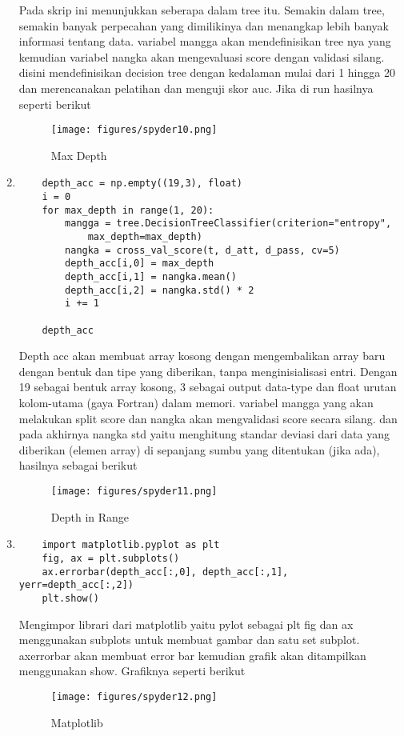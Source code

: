\begin{enumerate}
\par
Pada skrip ini menunjukkan seberapa dalam tree itu. Semakin dalam tree, semakin banyak perpecahan yang dimilikinya dan menangkap lebih banyak informasi tentang data. variabel mangga akan mendefinisikan tree nya yang kemudian variabel nangka akan mengevaluasi score dengan validasi silang. disini mendefinisikan decision tree dengan kedalaman mulai dari 1 hingga 20 dan merencanakan pelatihan dan menguji skor auc. Jika di run hasilnya seperti berikut
\begin{figure}[ht]
\centering
\texttt{[image: figures/spyder10.png]}
\caption{Max Depth}
\label{Spyder}
\end{figure}
\item
\begin{verbatim}
	depth_acc = np.empty((19,3), float)
	i = 0
	for max_depth in range(1, 20):
	    mangga = tree.DecisionTreeClassifier(criterion="entropy", 
			max_depth=max_depth)
	    nangka = cross_val_score(t, d_att, d_pass, cv=5)
	    depth_acc[i,0] = max_depth
	    depth_acc[i,1] = nangka.mean()
	    depth_acc[i,2] = nangka.std() * 2
	    i += 1

	depth_acc
\end{verbatim}

\par
Depth acc akan membuat array kosong dengan mengembalikan array baru dengan bentuk dan tipe yang diberikan, tanpa menginisialisasi entri. Dengan 19 sebagai bentuk array kosong, 3 sebagai output data-type dan float urutan kolom-utama (gaya Fortran) dalam memori. variabel mangga yang akan melakukan split score dan nangka akan mengvalidasi score secara silang. dan pada akhirnya nangka std yaitu menghitung standar deviasi dari data yang diberikan (elemen array) di sepanjang sumbu yang ditentukan (jika ada), hasilnya sebagai berikut
\begin{figure}[ht]
\centering
\texttt{[image: figures/spyder11.png]}
\caption{Depth in Range}
\label{Spyder}
\end{figure}
\item 
\begin{verbatim}
	import matplotlib.pyplot as plt
	fig, ax = plt.subplots()
	ax.errorbar(depth_acc[:,0], depth_acc[:,1], yerr=depth_acc[:,2])
	plt.show()
\end{verbatim}

\par
Mengimpor librari dari matplotlib yaitu pylot sebagai plt
fig dan ax menggunakan subplots untuk membuat gambar dan satu set subplot.
axerrorbar akan membuat error bar
kemudian grafik akan ditampilkan menggunakan show. Grafiknya seperti berikut

\begin{figure}[ht]
\centering
\texttt{[image: figures/spyder12.png]}
\caption{Matplotlib}
\label{Spyder}
\end{figure}
\end{enumerate}


